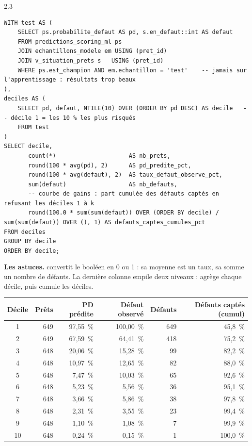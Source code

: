 \begin{correction}{2.3}
\begin{lstlisting}[style=long]
WITH test AS (
    SELECT ps.probabilite_defaut AS pd, s.en_defaut::int AS defaut
    FROM predictions_scoring_ml ps
    JOIN echantillons_modele em USING (pret_id)
    JOIN v_situation_prets s   USING (pret_id)
    WHERE ps.est_champion AND em.echantillon = 'test'    -- jamais sur l'apprentissage : résultats trop beaux
),
deciles AS (
    SELECT pd, defaut, NTILE(10) OVER (ORDER BY pd DESC) AS decile   -- décile 1 = les 10 % les plus risqués
    FROM test
)
SELECT decile,
       count(*)                     AS nb_prets,
       round(100 * avg(pd), 2)      AS pd_predite_pct,
       round(100 * avg(defaut), 2)  AS taux_defaut_observe_pct,
       sum(defaut)                  AS nb_defauts,
       -- courbe de gains : part cumulée des défauts captés en refusant les déciles 1 à k
       round(100.0 * sum(sum(defaut)) OVER (ORDER BY decile) / sum(sum(defaut)) OVER (), 1) AS defauts_captes_cumules_pct
FROM deciles
GROUP BY decile
ORDER BY decile;
\end{lstlisting}

\textbf{Les astuces.}  convertit le booléen en 0 ou 1 : sa moyenne est un taux,
sa somme un nombre de défauts. La dernière colonne empile deux niveaux :  agrège
chaque décile, puis  cumule les déciles.

\begin{resultat}
\begin{center}\small
\begin{tabular}{@{}crrrrr@{}}
\toprule
Décile & Prêts & PD prédite & Défaut observé & Défauts & Défauts captés (cumul) \\
\midrule
1 & 649 & 97,55~\% & 100,00~\% & 649 & 45,8~\% \\
2 & 649 & 67,59~\% & 64,41~\% & 418 & 75,2~\% \\
3 & 648 & 20,06~\% & 15,28~\% & 99 & 82,2~\% \\
4 & 648 & 10,97~\% & 12,65~\% & 82 & 88,0~\% \\
5 & 648 & 7,47~\% & 10,03~\% & 65 & 92,6~\% \\
6 & 648 & 5,23~\% & 5,56~\% & 36 & 95,1~\% \\
7 & 648 & 3,66~\% & 5,86~\% & 38 & 97,8~\% \\
8 & 648 & 2,31~\% & 3,55~\% & 23 & 99,4~\% \\
9 & 648 & 1,10~\% & 1,08~\% & 7 & 99,9~\% \\
10 & 648 & 0,24~\% & 0,15~\% & 1 & 100,0~\% \\
\bottomrule
\end{tabular}
\end{center}
\end{resultat}


\end{correction}
